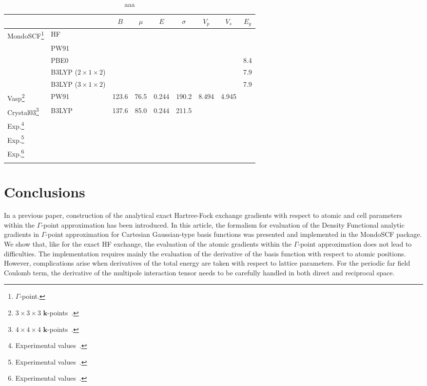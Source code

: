 \documentclass[pra,twocolumn,twocolumngrid,superbib]{revtex4} %
\begin{document}
\begin{table}[t]
  \centering
  \caption{\protect
    aaa
  }\label{Tab:FracCoords}
  \begin{tabular}{llccccccc}
  \toprule
  &  & $B$ & $\mu$ & $E$ & $\sigma$ & $V_p$ & $V_s$ & $E_g$ \\
  \hline
    {\sc MondoSCF}\footnote[1]{$\Gamma$-point.}
    & HF    &  &  &  &  &  &  & \\%
    & PW91  &  &  &  &  &  &  & \\%
    & PBE0  &  &  &  &  &  &  & 8.4 \\%
    & B3LYP ($2\times 1\times 2$)
            &  &  &  &  &  &  & 7.9 \\%
    & B3LYP ($3\times 1\times 2$)
            &  &  &  &  &  &  & 7.9 \\%
  \hline
    {\sc Vasp}\footnote[2]{$3\times 3\times 3$ $\mathbf{k}$-points~\cite{PJochym04}.}
    & PW91  & 123.6 & 76.5 & 0.244 & 190.2 & 8.494 & 4.945 & \\
    {\sc Crystal03}\footnote[3]{$4\times 4\times 4$ $\mathbf{k}$-points~\cite{YNoel06}.}
    & B3LYP & 137.6 & 85.0 & 0.244 & 211.5 &  &  & \\
  \hline
    {Exp.}\footnote[4]{Experimental values~\cite{????}.}
    &       &  &  &  &  &  &  &\\
    {Exp.}\footnote[5]{Experimental values~\cite{????}.}
    &       &  &  &  &  &  &  &\\
    {Exp.}\footnote[6]{Experimental values~\cite{????}.}
    &       &  &  &  &  &  &  &\\
  \botrule
  \end{tabular}
\end{table}





\section{Conclusions}\label{Sec:Conclusions}
In a previous paper, construction of the analytical
exact Hartree-Fock exchange gradients with respect to
atomic and cell parameters within the $\Gamma$-point
approximation has been introduced.
In this article, the formalism for evaluation of the Density
Functional analytic gradients in $\Gamma$-point approximation for
Cartesian Gaussian-type basis functions was presented and
implemented in the {\sc MondoSCF} package.
We show that, like for the exact HF exchange, the evaluation
of the atomic gradients within the $\Gamma$-point approximation
does not lead to difficulties. The implementation requires mainly
the evaluation of the derivative of the basis function with respect
to atomic positions.
However, complications arise when derivatives of the total energy
are taken with respect to lattice parameters. For the periodic far field Coulomb term,
the derivative of the multipole interaction tensor needs to be carefully handled in
both direct and reciprocal space.
\end{document}
